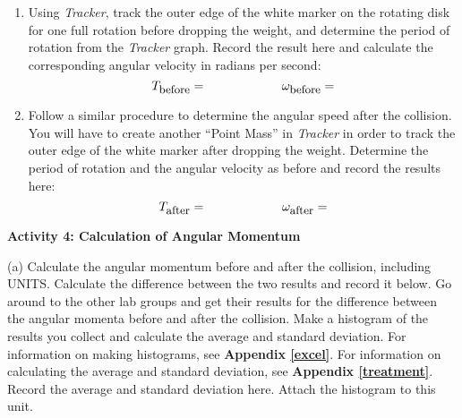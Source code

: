 \begin{enumerate}
\item Using \textit{Tracker}, track the outer edge of the white marker on the rotating disk 
for one full rotation before dropping the weight, and determine the period of rotation from the 
\textit{Tracker} graph. Record the result here and calculate the corresponding angular velocity 
in radians per second:
\[
T_{\mbox{\small before}}=\qquad \qquad \qquad \omega _{\mbox{\small before}}=\]
\item Follow a similar procedure to determine the angular speed after the collision. You will have 
to create another ``Point Mass'' in \textit{Tracker} in order to track the outer edge of the white 
marker after dropping the weight. Determine the period of rotation and the angular velocity as 
before and record the results here:
\[
T_{\mbox{\small after}}=\qquad \qquad \qquad \omega _{\mbox{\small after}}=\]

\end{enumerate}
\vspace{20mm}

\textbf{Activity 4: Calculation of Angular Momentum}

(a) Calculate the angular momentum before and after the collision, including UNITS. Calculate the difference between the two results and record it below. 
Go around to the other lab groups and get their results for the difference between the angular momenta before and after the collision.
Make a histogram of the results you collect and calculate the average and standard deviation.
For information on making histograms, see \textbf{Appendix \ref{excel}}. For information on calculating the average and standard deviation, see \textbf{Appendix \ref{treatment}}. 
Record the average and standard deviation here. Attach the histogram to this unit.
\vspace{5mm}

